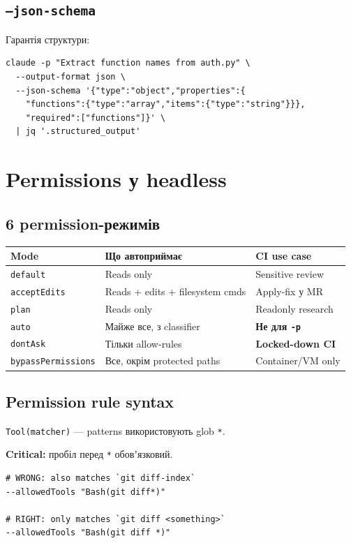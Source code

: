 \documentclass[11pt,a4paper]{article}
\begin{document}
\subsection{\texttt{--json-schema}}

Гарантія структури:

\begin{lstlisting}
claude -p "Extract function names from auth.py" \
  --output-format json \
  --json-schema '{"type":"object","properties":{
    "functions":{"type":"array","items":{"type":"string"}}},
    "required":["functions"]}' \
  | jq '.structured_output'
\end{lstlisting}

\section{Permissions у headless}

\subsection{6 permission-режимів}

\begin{tabular}{lll}
\hline
\textbf{Mode} & \textbf{Що автоприймає} & \textbf{CI use case} \\
\hline
\texttt{default} & Reads only & Sensitive review \\
\texttt{acceptEdits} & Reads + edits + filesystem cmds & Apply-fix у MR \\
\texttt{plan} & Reads only & Readonly research \\
\texttt{auto} & Майже все, з classifier & \textbf{Не для \texttt{-p}} \\
\texttt{dontAsk} & Тільки allow-rules & \textbf{Locked-down CI} \\
\texttt{bypassPermissions} & Все, окрім protected paths & Container/VM only \\
\hline
\end{tabular}

\subsection{Permission rule syntax}

\texttt{Tool(matcher)} --- patterns використовують glob \texttt{*}.

\textbf{Critical:} пробіл перед \texttt{*} обовʼязковий.

\begin{lstlisting}
# WRONG: also matches `git diff-index`
--allowedTools "Bash(git diff*)"

# RIGHT: only matches `git diff <something>`
--allowedTools "Bash(git diff *)"
\end{lstlisting}
\end{document}
